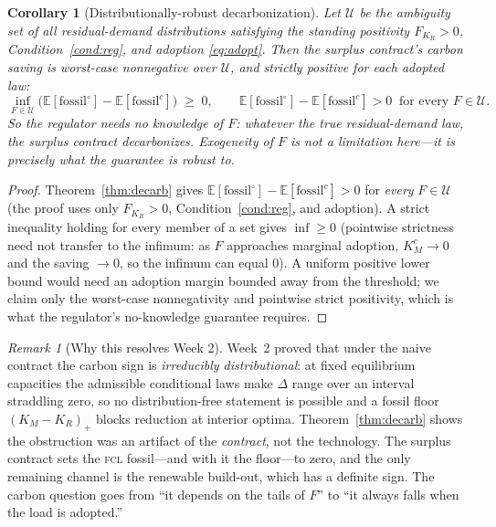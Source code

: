 \documentclass[11pt,reqno]{amsart}
\theoremstyle{plain}
\newtheorem{corollary}{Corollary}
\theoremstyle{definition}
\theoremstyle{remark}
\newtheorem{remark}{Remark}
\newcommand{\KR}{K_R}
\newcommand{\KM}{K_M}
\newcommand{\FKR}{F_{\!\KR}}
\newcommand{\E}{\mathbb{E}}
\newcommand{\fossil}{\mathrm{fossil}}
\begin{document}
\begin{corollary}[Distributionally-robust decarbonization]\label{cor:dro}
Let $\mathcal U$ be the ambiguity set of all residual-demand distributions satisfying the
standing positivity $\FKR>0$, Condition~\ref{cond:reg}, and adoption \eqref{eq:adopt}.
Then the surplus contract's carbon saving is worst-case \emph{nonnegative} over $\mathcal U$,
and strictly positive for each adopted law:
\[
  \inf_{F\in\mathcal U}\big(\E[\fossil^{\circ}]-\E[\fossil^{c}]\big)\;\ge\;0,
  \qquad \E[\fossil^{\circ}]-\E[\fossil^{c}]>0\ \text{ for every } F\in\mathcal U.
\]
So the regulator needs \emph{no knowledge of $F$}: whatever the true residual-demand law,
the surplus contract decarbonizes. Exogeneity of $F$ is not a limitation here---it is
precisely what the guarantee is robust to.
\end{corollary}
\begin{proof}
Theorem~\ref{thm:decarb} gives $\E[\fossil^{\circ}]-\E[\fossil^{c}]>0$ for \emph{every}
$F\in\mathcal U$ (the proof uses only $\FKR>0$, Condition~\ref{cond:reg}, and adoption).
A strict inequality holding for every member of a set gives $\inf\ge0$ (pointwise strictness
need not transfer to the infimum: as $F$ approaches marginal adoption, $K_M^{c}\to0$ and the
saving $\to0$, so the infimum can equal $0$). A uniform positive lower bound would need an
adoption margin bounded away from the threshold; we claim only the worst-case nonnegativity
and pointwise strict positivity, which is what the regulator's no-knowledge guarantee
requires.
\end{proof}

\begin{remark}[Why this resolves Week 2]\label{rem:resolve}
Week~2 proved that under the naive contract the carbon sign is \emph{irreducibly
distributional}: at fixed equilibrium capacities the admissible conditional laws make
$\Delta$ range over an interval straddling zero, so no distribution-free statement is
possible and a fossil floor $(\KM-\KR)_+$ blocks reduction at interior optima.
Theorem~\ref{thm:decarb} shows the obstruction was an artifact of the \emph{contract},
not the technology. The surplus contract sets the \textsc{fcl} fossil---and with it the
floor---to zero, and the only remaining channel is the renewable build-out, which has a
definite sign. The carbon question goes from ``it depends on the tails of $F$'' to
``it always falls when the load is adopted.''
\end{remark}

\end{document}
